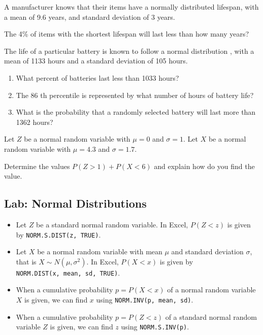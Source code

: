 \begin{exercise}

A manufacturer knows that their items have a normally distributed lifespan, with a mean of 9.6 years, and standard deviation of 3 years.

The 4\% of items with the shortest lifespan will last less than how many years?

\end{exercise}
\vspace*{6\baselineskip}

\begin{exercise}

The life of a particular battery is known to follow a normal distribution , with a mean of 1133 hours and a standard deviation of 105 hours.

\begin{enumerate}
  \item 
  What percent of batteries last less than 1033 hours?
  \item 
  The 86 th percentile is represented by what number of hours of battery life? 
  \item
  What is the probability that a randomly selected battery will last more than 1362 hours?
\end{enumerate}

\end{exercise}

\begin{exercise}

Let \(Z\) be a normal random variable with \(\mu=0\) and \(\sigma=1\).
Let \(X\) be a normal random variable with \(\mu=4.3\) and
\(\sigma=1.7\).

Determine the values \(P(Z>1) + P(X<6)\) and explain how do you find the
value.

\end{exercise}
\vspace*{4\baselineskip}

\hypertarget{lab-normal-distributions}{%
\subsection{Lab: Normal Distributions}\label{lab-normal-distributions}}

\begin{itemize}
\item
  Let \(Z\) be a standard normal random variable. In Excel, \(P(Z<z)\)
  is given by \texttt{NORM.S.DIST(z,\ TRUE)}.
\item
  Let \(X\) be a normal random variable with mean \(\mu\) and standard
  deviation \(\sigma\), that is \(X\sim N(\mu, \sigma^2)\). In Excel,
  \(P(X<x)\) is given by \texttt{NORM.DIST(x,\ mean,\ sd,\ TRUE)}.
\item
  When a cumulative probability \(p=P(X<x)\) of a normal random variable
  \(X\) is given, we can find \(x\) using
  \texttt{NORM.INV(p,\ mean,\ sd)}.
\item
  When a cumulative probability \(p=P(Z<z)\) of a standard normal random
  variable \(Z\) is given, we can find \(z\) using
  \texttt{NORM.S.INV(p)}.
\end{itemize}

